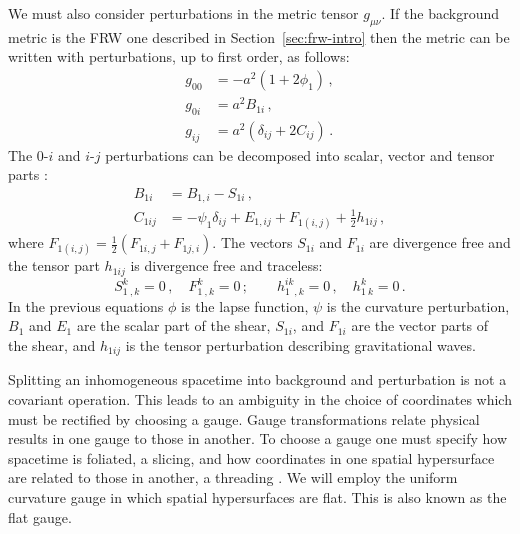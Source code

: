 We must also consider perturbations in the metric tensor $g_{\mu\nu}$. If the
background metric is the FRW one described in Section~\ref{sec:frw-intro} then
the metric can be written with perturbations, up to first order, as follows:
% 
\begin{align}
 \label{eq:pertmetric-intro}
 g_{00} &= -a^2 (1 + 2\phi_1) \,, \nonumber\\
 g_{0i} &= a^2 B_{1i} \,, \nonumber\\
 g_{ij} &= a^2\left(\delta_{ij} + 2C_{ij} \right) \,.
\end{align}
% 
The $0$-$i$ and $i$-$j$ perturbations can be decomposed into scalar, vector and
tensor parts \cite{Malik:2008im}:
\begin{align}
\label{eq:svt-intro}
  B_{1i} &= B_{1,i} - S_{1i} \,, \nonumber\\
  C_{1ij} &= -\psi_1\delta_{ij} + E_{1,ij} + F_{1(i,j)} + \frac{1}{2}h_{1ij}\,,
\end{align}
% 
where $F_{1(i,j)} = \frac{1}{2}(F_{1i,j} + F_{1j,i})$.
% 
The vectors $S_{1i}$ and $F_{1i}$ are divergence free and the tensor part
$h_{1ij}$
is divergence free and traceless:
% 
\begin{equation}
 S^k_{1~,k} = 0\,, \quad F^k_{1~,k}=0\,; \qquad h^{ik}_{1~~,k} = 0\,,
  \quad h^k_{1~k}= 0\,.
\end{equation}
% 
In the previous equations $\phi$ is the lapse function, $\psi$ is the curvature
perturbation, $B_1$ and $E_1$ are the scalar part of the shear, $S_{1i}$, and
$F_{1i}$
are the vector parts of the shear, and $h_{1ij}$ is the tensor perturbation
describing gravitational waves.


Splitting an inhomogeneous spacetime into background and perturbation is not a
covariant operation. This leads to an ambiguity in the choice of coordinates
which must be rectified by choosing a gauge. Gauge transformations relate
physical results in one gauge to those in another. To choose a gauge one must
specify how spacetime is foliated, \iec a slicing, and how coordinates in one
spatial hypersurface are related to those in another, \iec a threading
\cite{Malik:2008im}. We will
employ the uniform curvature gauge in which spatial hypersurfaces are flat. This
is also known as the flat gauge.

